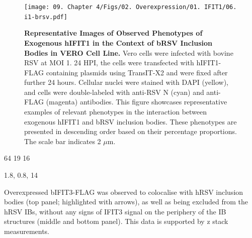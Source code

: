 \begin{figure}
    \centering
    \texttt{[image: 09. Chapter 4/Figs/02. Overexpression/01. IFIT1/06. i1-brsv.pdf]}
    \caption[Representative Images of Observed Phenotypes of Exogenous hIFIT1 in the Context of bRSV Inclusion Bodies in VERO Cell Line.]{\textbf{Representative Images of Observed Phenotypes of Exogenous hIFIT1 in the Context of bRSV Inclusion Bodies in VERO Cell Line.} Vero cells were infected with bovine RSV at MOI 1. 24 HPI, the cells were transfected with hIFIT1-FLAG containing plasmids using TransIT-X2 and were fixed after further 24 hours. Cellular nuclei were stained with DAPI (yellow), and cells were double-labeled with anti-RSV N (cyan) and anti-FLAG (magenta) antibodies. This figure showcases representative examples of relevant phenotypes in the interaction between exogenous hIFIT1 and bRSV inclusion bodies. These phenotypes are presented in descending order based on their percentage proportions. The scale bar indicates 2 \(\mu \mbox{m}\).}
    \label{fig:Representative Images of Observed Phenotypes of Exogenous hIFIT1 in the Context of bRSV Inclusion Bodies in VERO Cell Line}
\end{figure}

64 19 16

1.8, 0.8, 14

Overexpressed bIFIT3-FLAG was observed to colocalise with hRSV inclusion bodies (top panel; highlighted with arrows), as well as being excluded from the hRSV IBs, without any signs of IFIT3 signal on the periphery of the IB structures (middle and bottom panel). This data is supported by z stack measurements.

